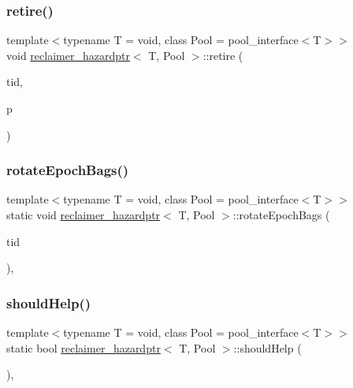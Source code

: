 \subsubsection{\texorpdfstring{retire()}{retire()}}
{\footnotesize\ttfamily template$<$typename T  = void, class Pool  = pool\+\_\+interface$<$\+T$>$$>$ \\
void \hyperlink{classreclaimer__hazardptr}{reclaimer\+\_\+hazardptr}$<$ T, Pool $>$\+::retire (\begin{DoxyParamCaption}\item[{const int}]{tid,  }\item[{T $\ast$}]{p }\end{DoxyParamCaption})\hspace{0.3cm}{\ttfamily [inline]}}

\mbox{\label{classreclaimer__hazardptr_aa2700ee9ec840f98ff0a6157f8f7388a}} 
\subsubsection{\texorpdfstring{rotate\+Epoch\+Bags()}{rotateEpochBags()}}
{\footnotesize\ttfamily template$<$typename T  = void, class Pool  = pool\+\_\+interface$<$\+T$>$$>$ \\
static void \hyperlink{classreclaimer__hazardptr}{reclaimer\+\_\+hazardptr}$<$ T, Pool $>$\+::rotate\+Epoch\+Bags (\begin{DoxyParamCaption}\item[{const int}]{tid }\end{DoxyParamCaption})\hspace{0.3cm}{\ttfamily [inline]}, {\ttfamily [static]}}

\mbox{\label{classreclaimer__hazardptr_a865c5e38124016c29c26485b4455c46b}} 
\subsubsection{\texorpdfstring{should\+Help()}{shouldHelp()}}
{\footnotesize\ttfamily template$<$typename T  = void, class Pool  = pool\+\_\+interface$<$\+T$>$$>$ \\
static bool \hyperlink{classreclaimer__hazardptr}{reclaimer\+\_\+hazardptr}$<$ T, Pool $>$\+::should\+Help (\begin{DoxyParamCaption}{ }\end{DoxyParamCaption})\hspace{0.3cm}{\ttfamily [inline]}, {\ttfamily [static]}}

